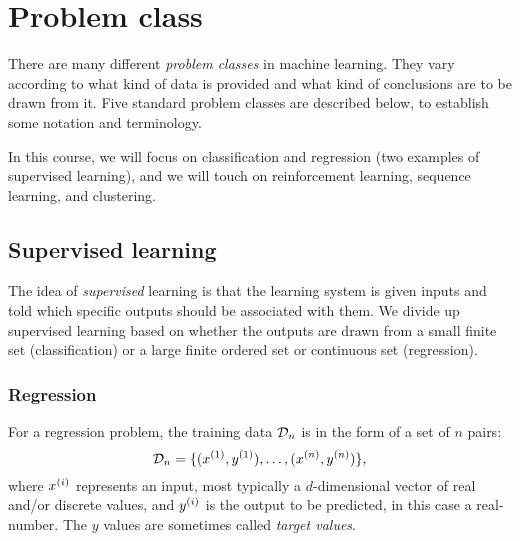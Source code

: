 
\section{Problem class}

There are many different {\em problem classes} in machine learning.
They vary according to what kind of data is provided and what kind of
conclusions are to be drawn from it.  %
Five standard problem classes are described below, to establish some notation and
terminology.

In this course, we will focus on classification and regression (two
examples of supervised learning), and we will touch on reinforcement
learning, sequence learning, and clustering.

\subsection{Supervised learning}

The idea of {\em supervised} learning is that the learning system is
given inputs and told which specific outputs should be associated with
them.  We divide up supervised learning based on whether the outputs
are drawn from a small finite set (classification) or a large finite
ordered set or continuous set (regression).

\subsubsection{Regression}

For a regression problem, the training data ${\cal D}_n$ is in the form of a set of $n$ pairs:
\[{\cal D}_n = \{(x^{(1)},
  y^{(1)}), \ldots, (x^{(n)}, y^{(n)})\},\]
where $x^{(i)}$
represents an input, most typically a
$d$-dimensional vector of real and/or discrete values, and
$y^{(i)}$ is the output to be predicted, in this case a real-number.
  The $y$ values are sometimes
called {\em target values}.

